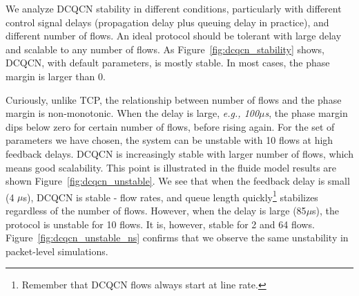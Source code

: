 We analyze DCQCN stability in different conditions, particularly with different
control signal delays (propagation delay plus queuing delay in practice), and
different number of flows. An ideal protocol should be tolerant with large delay
and scalable to any number of flows. As Figure~\ref{fig:dcqcn_stability} shows,
DCQCN, with default parameters, is mostly stable. In most cases, the phase
margin is larger than 0.

Curiously, unlike TCP, the relationship between number of flows and the phase
margin is non-monotonic. When the delay is large, {\em e.g., 100$\mu$s}, the
phase margin dips below zero for certain number of flows, before rising again.
For the set of parameters we have chosen, the system can be unstable with 10
flows at high feedback delays.  DCQCN is increasingly stable with larger number
of flows, which means good scalability. This point is illustrated in the fluide
model results are shown Figure~\ref{fig:dcqcn_unstable}. We see that when the
feedback delay is small (4 $\mu$s), DCQCN is stable - flow rates, and queue
length quickly\footnote{Remember that DCQCN flows always start at line rate.}
stabilizes regardless of the number of flows. However, when the delay is large
(85$\mu$s), the protocol is unstable for 10 flows. It is, however, stable for 2
and 64 flows. Figure~\ref{fig:dcqcn_unstable_ns} confirms that we observe the
same unstability in packet-level simulations.

